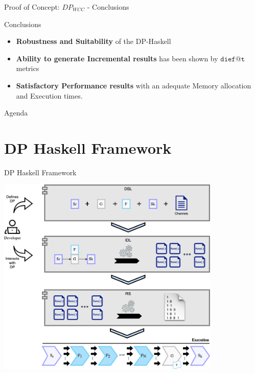 \documentclass{beamer}
\begin{document}
  \begin{frame}[fragile]{Proof of Concept: $DP_{WCC}$ - Conclusions}
    \begin{block}{Conclusions}      

    \begin{itemize}
      \item \textbf{Robustness and Suitability} of the DP-Haskell 
      \item \textbf{Ability to generate Incremental results} has been shown by $\mathtt{dief@t}$ metrics
      \item \textbf{Satisfactory Performance results} with an adequate Memory allocation and Execution times. 
    \end{itemize}
  \end{block}
  \end{frame}


  \begin{frame}{Agenda}
    \section{DP Haskell Framework}
    \tableofcontents[currentsection]
  \end{frame}

  \begin{frame}[fragile]{DP Haskell Framework}
    \begin{center}
      \includegraphics[width = 0.8\textwidth, height = 0.8\textheight]{dpf_haskell_v3}
    \end{center}
  \end{frame}
\end{document}

